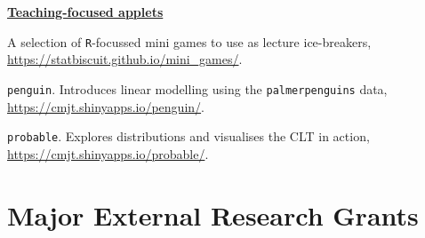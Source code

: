 \documentclass[10pt,a4paper]{moderncv}
\begin{document}
\underline{\textbf{Teaching-focused applets}}\\
\vspace{-3pt}

A selection of \texttt{R}-focussed mini games to use as lecture ice-breakers, \url{https://statbiscuit.github.io/mini_games/}.\\

\vspace{-3pt}

\texttt{penguin}. Introduces linear modelling using the \texttt{palmerpenguins} data, \url{https://cmjt.shinyapps.io/penguin/}.\\

\vspace{-3pt}

\texttt{probable}. Explores distributions and visualises the CLT in action, \url{https://cmjt.shinyapps.io/probable/}.\\

\newpage
\section{Major External Research Grants}
\end{document}
